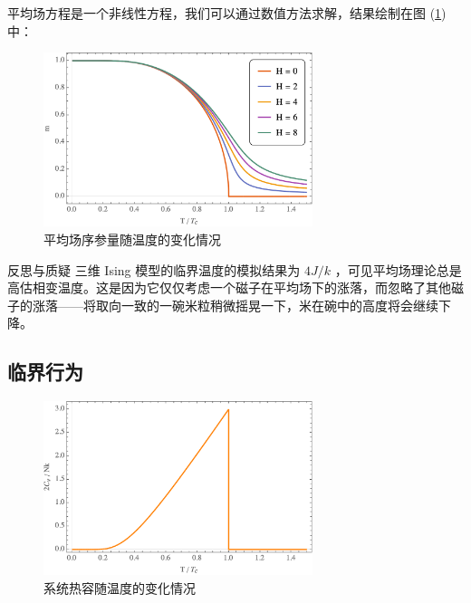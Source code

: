 平均场方程是一个非线性方程，我们可以通过数值方法求解，结果绘制在图 (\ref*{fig:one-dim-ising}) 中：
\begin{figure}[ht]
    \centering
    \includegraphics[width=0.7\textwidth]{figures/mean-field-mean-spin.png}
    \caption{\kaishu 平均场序参量随温度的变化情况}
    \label{fig:one-dim-ising}
\end{figure}

\begin{justification}{\kaishu 反思与质疑}
\kaishu \fontsize{11pt}{16pt}
\quad\quad 三维 Ising 模型的临界温度的模拟结果为 $4J/k $ ，可见平均场理论总是高估相变温度。这是因为它仅仅考虑一个磁子在平均场下的涨落，而忽略了其他磁子的涨落——将取向一致的一碗米粒稍微摇晃一下，米在碗中的高度将会继续下降。
\end{justification}

\subsection{临界行为}\label{sub:临界行为}

\begin{figure}[ht]
    \centering
    \includegraphics[width=0.7\textwidth]{figures/meanfield-heat-capacity.png}
    \caption{\kaishu 系统热容随温度的变化情况}
    \label{fig:sol-capa}
\end{figure}

